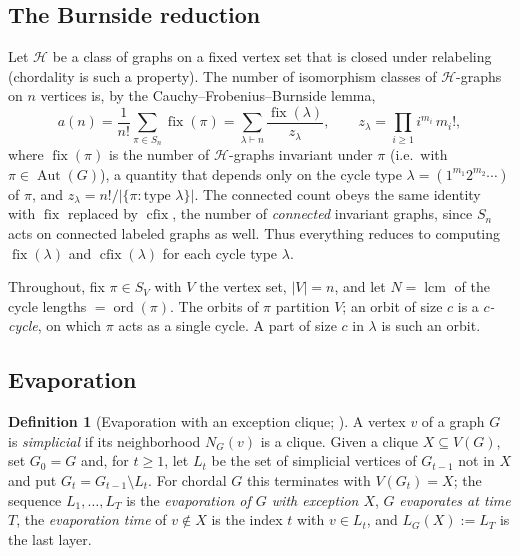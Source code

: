 \documentclass[11pt]{article}
\theoremstyle{plain}
\theoremstyle{definition}
\newtheorem{definition}{Definition}
\DeclareMathOperator{\fix}{fix}
\DeclareMathOperator{\cfix}{cfix}
\DeclareMathOperator{\Aut}{Aut}
\DeclareMathOperator{\lcm}{lcm}
\begin{document}
\subsection{The Burnside reduction}

Let $\mathcal H$ be a class of graphs on a fixed vertex set that is closed under relabeling
(chordality is such a property). The number of isomorphism classes of $\mathcal H$-graphs on $n$
vertices is, by the Cauchy--Frobenius--Burnside lemma,
\begin{equation}\label{eq:burnside}
a(n)=\frac{1}{n!}\sum_{\pi\in S_n}\fix(\pi)
   =\sum_{\lambda\vdash n}\frac{\fix(\lambda)}{z_\lambda},
\qquad z_\lambda=\prod_{i\ge 1} i^{m_i}\,m_i!,
\end{equation}
where $\fix(\pi)$ is the number of $\mathcal H$-graphs invariant under $\pi$ (i.e.\ with
$\pi\in\Aut(G)$), a quantity that depends only on the cycle type $\lambda=(1^{m_1}2^{m_2}\cdots)$ of
$\pi$, and $z_\lambda=n!/|\{\pi:\text{type }\lambda\}|$. The connected count obeys the same identity
with $\fix$ replaced by $\cfix$, the number of \emph{connected} invariant graphs, since $S_n$ acts on
connected labeled graphs as well. Thus everything reduces to computing $\fix(\lambda)$ and
$\cfix(\lambda)$ for each cycle type $\lambda$.

Throughout, fix $\pi\in S_V$ with $V$ the vertex set, $|V|=n$, and let $N=\lcm$ of the cycle lengths
$=\operatorname{ord}(\pi)$. The orbits of $\pi$ partition $V$; an orbit of size $c$ is a
\emph{$c$-cycle}, on which $\pi$ acts as a single cycle. A part of size $c$ in $\lambda$ is such an
orbit.

\subsection{Evaporation}

\begin{definition}[Evaporation with an exception clique; \cite{HLV2023}]\label{def:evap}
A vertex $v$ of a graph $G$ is \emph{simplicial} if its neighborhood $N_G(v)$ is a clique. Given a
clique $X\subseteq V(G)$, set $G_0=G$ and, for $t\ge1$, let $L_t$ be the set of simplicial vertices
of $G_{t-1}$ not in $X$ and put $G_t=G_{t-1}\setminus L_t$. For chordal $G$ this terminates with
$V(G_t)=X$; the sequence $L_1,\dots,L_T$ is the \emph{evaporation of $G$ with exception $X$}, $G$
\emph{evaporates at time $T$}, the \emph{evaporation time} of $v\notin X$ is the index $t$ with
$v\in L_t$, and $L_G(X):=L_T$ is the last layer.
\end{definition}
\end{document}

